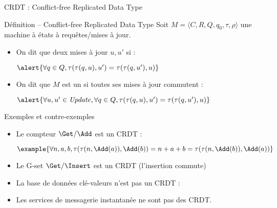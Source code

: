 
\begingroup


\begin{frame}{CRDT : Conflict-free Replicated Data Type}

  \vspace{-3mm}
  \begin{block}{Définition -- Conflict-free Replicated Data Type}
    Soit $M=\langle C, R, Q, q_0, \tau, \rho \rangle$ une machine à états à requêtes/mises à jour.
    \begin{itemize}
    \item On dit que deux mises à jour $u, u'$  si :
      \begin{center}
        $\alert{\forall q\in Q, \tau(\tau(q, u), u') = \tau(\tau(q, u'), u)}$
      \end{center}
    \item On dit que $M$ est un  si toutes ses mises à jour commutent :
      \begin{center}
        $\alert{\forall u, u'\in \mathit{Update}, \forall q\in Q, \tau(\tau(q, u), u') = \tau(\tau(q, u'), u)}$
      \end{center}
    \end{itemize}
  \end{block}

  \pause

  \vspace{-1mm}
  \begin{exampleblock}{Exemples et contre-exemples}
  \vspace{-1mm}
    \begin{itemize}
    \item<2-> Le compteur $\Get/\Add$ est un CRDT :
      \begin{center}
        $\example{\forall n, a, b, \tau(\tau(n, \Add(a)), \Add(b)) = n+a+b = \tau(\tau(n, \Add(b)), \Add(a))}$
      \end{center}
    \item<3-> Le G-set $\Get/\Insert$ est un CRDT (l'insertion commute)
    \item<4-> La base de données clé-valeurs n'est pas un CRDT :
      \begin{center}
      \end{center}
    \item<5-> Les services de messagerie instantanée ne sont pas des CRDT.
    \end{itemize}
  \end{exampleblock}

  
\end{frame}

\endgroup
\endinput

